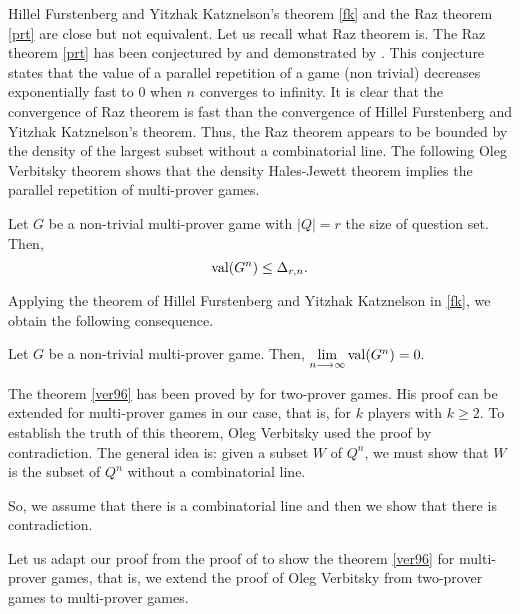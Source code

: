 Hillel Furstenberg and Yitzhak Katznelson's theorem \eqref{fk} and the Raz theorem \eqref{prt} are close but not equivalent. Let us recall what Raz theorem is. 
The Raz theorem \eqref{prt} has been conjectured by \cite{feige1992two} and demonstrated by \cite{raz1998parallel}. This conjecture states that the value of a parallel repetition of a game (non trivial) decreases exponentially  fast to $0$ when $n$ converges to infinity.  It is clear that the convergence of Raz theorem is fast than the convergence of Hillel Furstenberg and Yitzhak Katznelson's theorem. Thus, the Raz theorem appears to be bounded by the density of the largest subset without a combinatorial line.
The following Oleg Verbitsky theorem  shows that the density Hales-Jewett theorem implies the parallel repetition of multi-prover games.

\begin{thm}	 Let $G$ be a non-trivial multi-prover game with $|Q|=r$ the size of question set. Then, 
  $$\mathrm{val} (G^n) \leq \Delta_{r,n}.$$	\label{ver96} \end{thm}

Applying the theorem of Hillel Furstenberg and Yitzhak Katznelson in \eqref{fk}, we obtain the following consequence.
\begin{cor}	Let $G$ be a non-trivial multi-prover game. Then, $\lim\limits_{n\longrightarrow \infty} \mathrm{val} (G^n)=0.$ 	\end{cor}

The theorem \eqref{ver96}  has been proved by \cite{verbitsky1996towards} for two-prover games.  His proof can be extended for  multi-prover games in our case,  that is, for $k$ players with $k\geq 2.$ To establish the truth of  this theorem, Oleg Verbitsky used the proof by contradiction. The general idea is: given a subset $W$ of $Q^n$, we must show that $W$ is  the subset of $Q^n$ without a combinatorial line.

So, we assume that there is a combinatorial line and then we show that there is  contradiction.

Let us adapt our proof from the proof of  \cite{verbitsky1996towards} to show the theorem \eqref{ver96} for multi-prover games, that is, we extend the proof of Oleg Verbitsky from two-prover games to multi-prover games.

